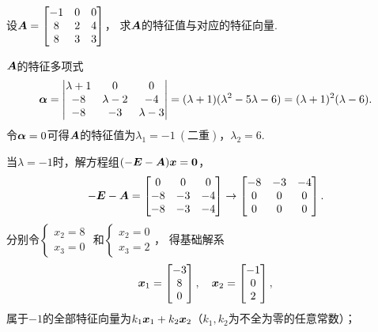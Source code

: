 \begin{example}
设\(\boldsymbol{A} = \begin{bmatrix} -1 & 0 & 0 \\ 8 & 2 & 4 \\ 8 & 3 & 3 \end{bmatrix}\)，
求\(\boldsymbol{A}\)的特征值与对应的特征向量.
\begin{solution}
\(\boldsymbol{A}\)的特征多项式\begin{equation*}
	\boldsymbol\alpha = \begin{vmatrix}
		\lambda+1 & 0 & 0 \\
		-8 & \lambda-2 & -4 \\
		-8 & -3 & \lambda-3
	\end{vmatrix}
	= (\lambda+1)(\lambda^2-5\lambda-6)
	= (\lambda+1)^2(\lambda-6).
\end{equation*}
令\(\boldsymbol\alpha = 0\)可得\(\boldsymbol{A}\)的特征值为\(\lambda_1=-1\ (\text{二重})\)，\(\lambda_2=6\).

当\(\lambda=-1\)时，解方程组\((-\boldsymbol{E}-\boldsymbol{A})\boldsymbol{x}=\boldsymbol0\)，\begin{equation*}
	-\boldsymbol{E}-\boldsymbol{A}
	= \begin{bmatrix} 0 & 0 & 0 \\ -8 & -3 & -4 \\ -8 & -3 & -4 \end{bmatrix}
	\to \begin{bmatrix} -8 & -3 & -4 \\ 0 & 0 & 0 \\ 0 & 0 & 0 \end{bmatrix}.
\end{equation*}
分别令\(\left\{ \begin{array}{l} x_2=8 \\ x_3=0 \end{array} \right.\)
和\(\left\{ \begin{array}{l} x_2=0 \\ x_3=2 \end{array} \right.\)，
得基础解系\begin{equation*}
	\boldsymbol{x}_1 = \begin{bmatrix} -3 \\ 8 \\ 0 \end{bmatrix},
	\quad
	\boldsymbol{x}_2 = \begin{bmatrix} -1 \\ 0 \\ 2 \end{bmatrix},
\end{equation*}
属于\(-1\)的全部特征向量为\(k_1\boldsymbol{x}_1+k_2\boldsymbol{x}_2\)（\(k_1,k_2\)为不全为零的任意常数）；


\end{solution}
\end{example}

